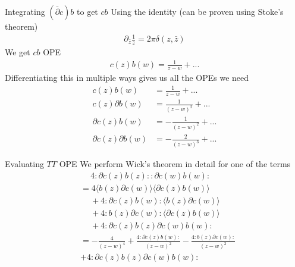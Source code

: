 \documentclass{beamer}
\newcommand{\paren}[1]{\ensuremath{\left(#1\right)}}
\begin{document}
\begin{frame}{Integrating $(\bar \partial c) b$ to get $cb$}
    Using the identity (can be proven using Stoke's theorem)
    \begin{align}
        \partial_{\bar{z}} \frac{1}{z} = 2\pi \delta \paren{z, \bar z}
    \end{align}
    We get $cb$ OPE
    \begin{align}
        c(z)b(w) = \frac{1}{z-w} + ...
    \end{align}
    Differentiating this in multiple ways gives us all the OPEs we need
    \begin{align}
        c(z)b(w) &= \frac{1}{z-w} + ... \\
        c(z) \partial b(w) &= \frac{1}{(z-w)^2} + ... \\
        \partial c(z) b(w) &= -\frac{1}{(z-w)^2} + ... \\
        \partial c(z) \partial b(w) &= -\frac{2}{(z-w)^3} + ... 
    \end{align}
\end{frame}
\begin{frame}{Evaluating $TT$ OPE}
    We perform Wick's theorem in detail for one of the terms
    \begin{align}
        &\quad\ 4 : \partial c(z) b(z):: \partial c(w) b(w): \\
        &=  4\langle b(z) \partial c(w)\rangle\langle\partial c(z) b(w)\rangle \\
& \quad\ +4: \partial c(z) b(w):\langle b(z) \partial c(w)\rangle \\
& \quad\  +4: b(z) \partial c(w):\langle\partial c(z) b(w)\rangle \\
& \quad\  +4: \partial c(z) b(z) \partial c(w) b(w): \\
& = -\frac{4}{(z-w)^4}+\frac{4: \partial c(z) b(w):}{(z-w)^2} - \frac{4: b(z) \partial c(w):}{(z-w)^2}\\&+4: \partial c(z) b(z) \partial c(w) b(w):
    \end{align}
\end{frame}
\end{document}
